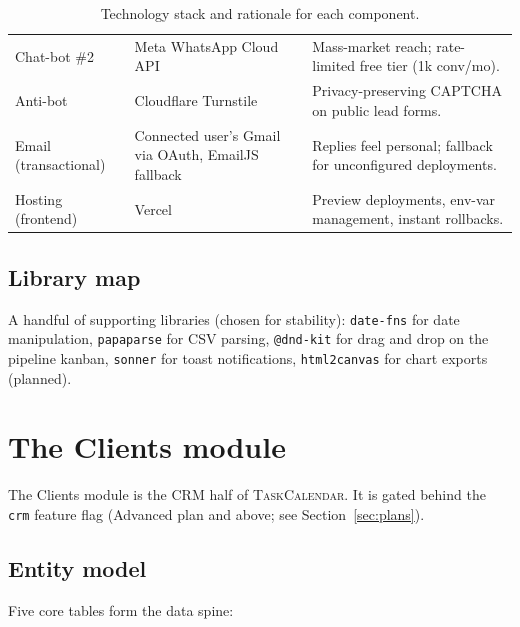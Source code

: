 \documentclass[11pt,a4paper,oneside]{article}
\newcommand{\tc}{\textsc{TaskCalendar}}
\newcommand{\code}[1]{\texttt{\small #1}}
\begin{document}
\begin{table}[H]
\begin{tabularx}{\textwidth}{@{}llX@{}}
Chat-bot \#2          & Meta WhatsApp Cloud API                           & Mass-market reach; rate-limited free tier (1k conv/mo). \\
Anti-bot              & Cloudflare Turnstile                              & Privacy-preserving CAPTCHA on public lead forms. \\
Email (transactional) & Connected user's Gmail via OAuth, EmailJS fallback & Replies feel personal; fallback for unconfigured deployments. \\
Hosting (frontend)    & Vercel                                            & Preview deployments, env-var management, instant rollbacks. \\
\bottomrule
\end{tabularx}
\caption{Technology stack and rationale for each component.}
\label{tab:stack}
\end{table}

\subsection{Library map}

A handful of supporting libraries (chosen for stability):
\code{date-fns} for date manipulation, \code{papaparse} for CSV
parsing, \code{@dnd-kit} for drag and drop on the pipeline kanban,
\code{sonner} for toast notifications, \code{html2canvas} for chart
exports (planned).

\section{The Clients module}\label{sec:clients}

The Clients module is the CRM half of \tc{}. It is gated behind the
\code{crm} feature flag (Advanced plan and above; see
Section~\ref{sec:plans}).

\subsection{Entity model}

Five core tables form the data spine:
\end{document}
